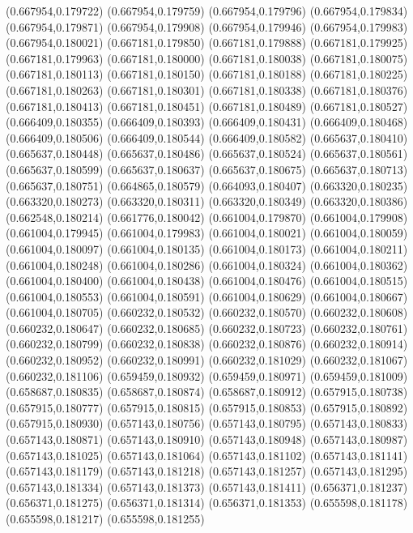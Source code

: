 (0.667954,0.179722)
(0.667954,0.179759)
(0.667954,0.179796)
(0.667954,0.179834)
(0.667954,0.179871)
(0.667954,0.179908)
(0.667954,0.179946)
(0.667954,0.179983)
(0.667954,0.180021)
(0.667181,0.179850)
(0.667181,0.179888)
(0.667181,0.179925)
(0.667181,0.179963)
(0.667181,0.180000)
(0.667181,0.180038)
(0.667181,0.180075)
(0.667181,0.180113)
(0.667181,0.180150)
(0.667181,0.180188)
(0.667181,0.180225)
(0.667181,0.180263)
(0.667181,0.180301)
(0.667181,0.180338)
(0.667181,0.180376)
(0.667181,0.180413)
(0.667181,0.180451)
(0.667181,0.180489)
(0.667181,0.180527)
(0.666409,0.180355)
(0.666409,0.180393)
(0.666409,0.180431)
(0.666409,0.180468)
(0.666409,0.180506)
(0.666409,0.180544)
(0.666409,0.180582)
(0.665637,0.180410)
(0.665637,0.180448)
(0.665637,0.180486)
(0.665637,0.180524)
(0.665637,0.180561)
(0.665637,0.180599)
(0.665637,0.180637)
(0.665637,0.180675)
(0.665637,0.180713)
(0.665637,0.180751)
(0.664865,0.180579)
(0.664093,0.180407)
(0.663320,0.180235)
(0.663320,0.180273)
(0.663320,0.180311)
(0.663320,0.180349)
(0.663320,0.180386)
(0.662548,0.180214)
(0.661776,0.180042)
(0.661004,0.179870)
(0.661004,0.179908)
(0.661004,0.179945)
(0.661004,0.179983)
(0.661004,0.180021)
(0.661004,0.180059)
(0.661004,0.180097)
(0.661004,0.180135)
(0.661004,0.180173)
(0.661004,0.180211)
(0.661004,0.180248)
(0.661004,0.180286)
(0.661004,0.180324)
(0.661004,0.180362)
(0.661004,0.180400)
(0.661004,0.180438)
(0.661004,0.180476)
(0.661004,0.180515)
(0.661004,0.180553)
(0.661004,0.180591)
(0.661004,0.180629)
(0.661004,0.180667)
(0.661004,0.180705)
(0.660232,0.180532)
(0.660232,0.180570)
(0.660232,0.180608)
(0.660232,0.180647)
(0.660232,0.180685)
(0.660232,0.180723)
(0.660232,0.180761)
(0.660232,0.180799)
(0.660232,0.180838)
(0.660232,0.180876)
(0.660232,0.180914)
(0.660232,0.180952)
(0.660232,0.180991)
(0.660232,0.181029)
(0.660232,0.181067)
(0.660232,0.181106)
(0.659459,0.180932)
(0.659459,0.180971)
(0.659459,0.181009)
(0.658687,0.180835)
(0.658687,0.180874)
(0.658687,0.180912)
(0.657915,0.180738)
(0.657915,0.180777)
(0.657915,0.180815)
(0.657915,0.180853)
(0.657915,0.180892)
(0.657915,0.180930)
(0.657143,0.180756)
(0.657143,0.180795)
(0.657143,0.180833)
(0.657143,0.180871)
(0.657143,0.180910)
(0.657143,0.180948)
(0.657143,0.180987)
(0.657143,0.181025)
(0.657143,0.181064)
(0.657143,0.181102)
(0.657143,0.181141)
(0.657143,0.181179)
(0.657143,0.181218)
(0.657143,0.181257)
(0.657143,0.181295)
(0.657143,0.181334)
(0.657143,0.181373)
(0.657143,0.181411)
(0.656371,0.181237)
(0.656371,0.181275)
(0.656371,0.181314)
(0.656371,0.181353)
(0.655598,0.181178)
(0.655598,0.181217)
(0.655598,0.181255)
